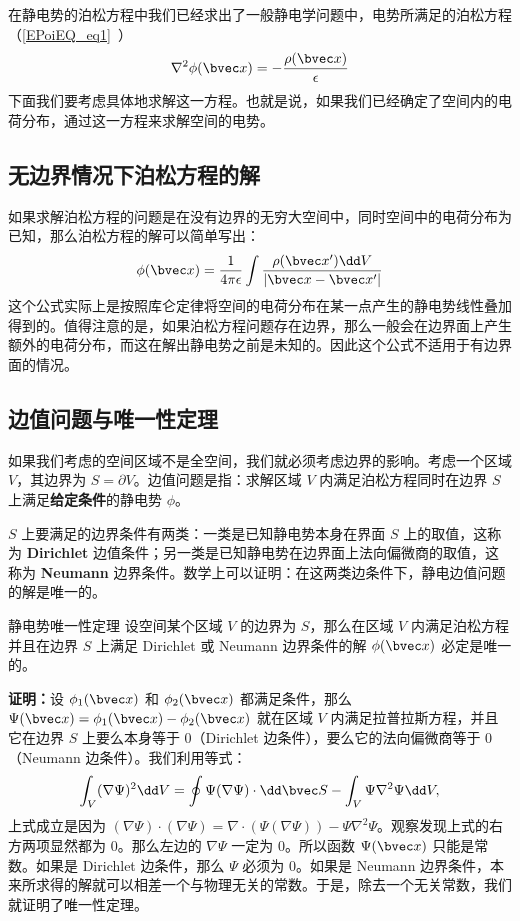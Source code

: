 

在静电势的泊松方程中我们已经求出了一般静电学问题中，电势所满足的泊松方程（\autoref{EPoiEQ_eq1}~）
\begin{align}
\nabla^2 \phi(\bvec x)=-\frac{\rho(\bvec x)}{\epsilon}
\end{align}
下面我们要考虑具体地求解这一方程。也就是说，如果我们已经确定了空间内的电荷分布，通过这一方程来求解空间的电势。
\subsection{无边界情况下泊松方程的解}
如果求解泊松方程的问题是在没有边界的无穷大空间中，同时空间中的电荷分布为已知，那么泊松方程的解可以简单写出：
\begin{align}
\phi(\bvec x)=\frac{1}{4\pi \epsilon}\int \frac{\rho (\bvec x')\dd V}{|\bvec x-\bvec x'|}
\end{align}
这个公式实际上是按照库仑定律将空间的电荷分布在某一点产生的静电势线性叠加得到的。值得注意的是，如果泊松方程问题存在边界，那么一般会在边界面上产生额外的电荷分布，而这在解出静电势之前是未知的。因此这个公式不适用于有边界面的情况。
\subsection{边值问题与唯一性定理}
如果我们考虑的空间区域不是全空间，我们就必须考虑边界的影响。考虑一个区域 $V$，其边界为 $S=\partial V$。边值问题是指：求解区域 $V$ 内满足泊松方程同时在边界 $S$ 上满足\textbf{给定条件}的静电势 $\phi$。

$S$ 上要满足的边界条件有两类：一类是已知静电势本身在界面 $S$
上的取值，这称为 \textbf{Dirichlet} 边值条件；另一类是已知静电势在边界面上法向偏微商的取值，这称为 \textbf{Neumann} 边界条件。数学上可以证明：在这两类边条件下，静电边值问题的解是唯一的。
\begin{theorem}{静电势唯一性定理}\label{empoi_the1}
设空间某个区域 $V$ 的边界为 $S$，那么在区域 $V$ 内满足泊松方程并且在边界 $S$ 上满足 Dirichlet 或 Neumann 边界条件的解 $\phi(\bvec x)$ 必定是唯一的。
\end{theorem}
\textbf{证明：}设 $\phi_1(\bvec x)$ 和 $\phi_2(\bvec x)$ 都满足条件，那么 $\Psi(\bvec x)=\phi_1(\bvec x)-\phi_2(\bvec x)$ 就在区域 $V$ 内满足拉普拉斯方程，并且它在边界 $S$ 上要么本身等于 $0$（Dirichlet 边条件），要么它的法向偏微商等于 $0$（Neumann 边条件）。我们利用等式：
\begin{align}
\int_V (\nabla \Psi)^2 \dd V=\oint \Psi(\nabla \Psi)\cdot \dd \bvec S - \int_V \Psi \nabla^2\Psi \dd V,
\end{align}
上式成立是因为 $(\nabla \Psi)\cdot (\nabla \Psi)=\nabla\cdot (\Psi(\nabla\Psi))-\Psi\nabla^2\Psi$。观察发现上式的右方两项显然都为 $0$。那么左边的 $\nabla\Psi$ 一定为 $0$。所以函数 $\Psi(\bvec x)$ 只能是常数。如果是 Dirichlet 边条件，那么 $\Psi$ 必须为 $0$。如果是 Neumann 边界条件，本来所求得的解就可以相差一个与物理无关的常数。于是，除去一个无关常数，我们就证明了唯一性定理。

